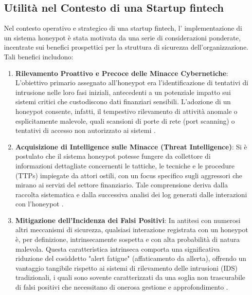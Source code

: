 \subsection{Utilità nel Contesto di una Startup fintech}

\label{subsec:utilita_fintech}



Nel contesto operativo e strategico di una startup fintech, l' implementazione di un sistema honeypot è stata motivata da una serie di considerazioni ponderate, incentrate sui benefici prospettici per la struttura di sicurezza dell'organizzazione. Tali benefici includono:

\begin{enumerate}

\item \textbf{Rilevamento Proattivo e Precoce delle Minacce Cybernetiche}: L'obiettivo primario assegnato all'honeypot era l'identificazione di tentativi di intrusione nelle loro fasi iniziali, antecedenti a un potenziale impatto sui sistemi critici che custodiscono dati finanziari sensibili. L'adozione di un honeypot consente, infatti, il tempestivo rilevamento di attività anomale o esplicitamente malevole, quali scansioni di porte di rete (port scanning) o tentativi di accesso non autorizzato ai sistemi \cite{proofpoint2024}.

\item \textbf{Acquisizione di Intelligence sulle Minacce (Threat Intelligence)}: Si è postulato che il sistema honeypot potesse fungere da collettore di informazioni dettagliate concernenti le tattiche, le tecniche e le procedure (TTPs) impiegate da attori ostili, con un focus specifico sugli aggressori che mirano ai servizi del settore finanziario. Tale comprensione deriva dalla raccolta sistematica e dalla successiva analisi dei log generati dalle interazioni con l'honeypot \cite{mairh2011}.

\item \textbf{Mitigazione dell'Incidenza dei Falsi Positivi}: In antitesi con numerosi altri meccanismi di sicurezza, qualsiasi interazione registrata con un honeypot è, per definizione, intrinsecamente sospetta e con alta probabilità di natura malevola. Questa caratteristica intrinseca comporta una significativa riduzione del cosiddetto "alert fatigue" (affaticamento da allerta), offrendo un vantaggio tangibile rispetto ai sistemi di rilevamento delle intrusioni (IDS) tradizionali, i quali sono sovente caratterizzati da una soglia non trascurabile di falsi positivi che necessitano di onerosa gestione e approfondimento \cite{perego_2023}.


\end{enumerate}
